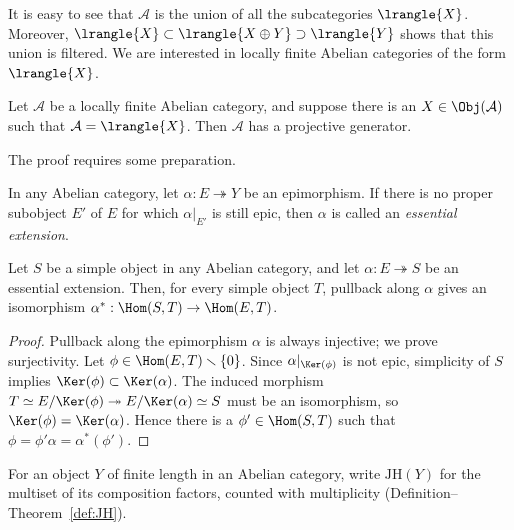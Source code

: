 It is easy to see that $\mathcal{A}$ is the union of all the subcategories $\lrangle{X}$. Moreover, $\lrangle{X}\subset\lrangle{X\oplus Y}\supset\lrangle{Y}$ shows that this union is filtered. We are interested in locally finite Abelian categories of the form $\lrangle{X}$.

\begin{proposition}[O.\ Gabber]\label{prop:subcat-union}
	Let $\mathcal{A}$ be a locally finite Abelian category, and suppose there is an $X\in\Obj(\mathcal{A})$ such that $\mathcal{A}=\lrangle{X}$. Then $\mathcal{A}$ has a projective generator.
\end{proposition}

The proof requires some preparation.

\begin{definition}
	In any Abelian category, let $\alpha:E\twoheadrightarrow Y$ be an epimorphism. If there is no proper subobject $E'$ of $E$ for which $\alpha|_{E'}$ is still epic, then $\alpha$ is called an \emph{essential extension}.
\end{definition}

\begin{lemma}\label{prop:essential-ext-aux0}
	Let $S$ be a simple object in any Abelian category, and let $\alpha:E\twoheadrightarrow S$ be an essential extension. Then, for every simple object $T$, pullback along $\alpha$ gives an isomorphism $\alpha^*:\Hom(S,T)\to\Hom(E,T)$.
\end{lemma}
\begin{proof}
	Pullback along the epimorphism $\alpha$ is always injective; we prove surjectivity. Let $\phi\in\Hom(E,T)\smallsetminus\{0\}$. Since $\alpha|_{\Ker(\phi)}$ is not epic, simplicity of $S$ implies $\Ker(\phi)\subset\Ker(\alpha)$. The induced morphism
	$T\simeq E/\Ker(\phi)\twoheadrightarrow E/\Ker(\alpha)\simeq S$ must be an isomorphism, so $\Ker(\phi)=\Ker(\alpha)$. Hence there is a $\phi'\in\Hom(S,T)$ such that
	$\phi=\phi'\alpha=\alpha^*(\phi')$.
\end{proof}

For an object $Y$ of finite length in an Abelian category, write $\mathrm{JH}(Y)$ for the multiset of its composition factors, counted with multiplicity (Definition--Theorem~\ref{def:JH}).

